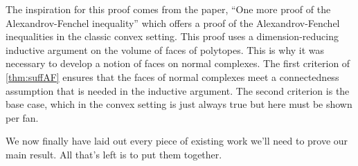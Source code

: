 \documentclass[12pt,oneside]{../../sfsuthesis}
\begin{document}
The inspiration for this proof comes from the paper, ``One more proof of the Alexandrov-Fenchel inequality'' \cite{cordero-erausquinOneMoreProof2019} which offers a proof of the Alexandrov-Fenchel inequalities in the classic convex setting.
This proof uses a dimension-reducing inductive argument on the volume of faces of polytopes.
This is why it was necessary to develop a notion of faces on normal complexes.
The first criterion of \th\ref{thm:suffAF} ensures that the faces of normal complexes meet a connectedness assumption that is needed in the inductive argument.
The second criterion is the base case, which in the convex setting is just always true but here must be shown per fan.

We now finally have laid out every piece of existing work we'll need to prove our main result.
All that's left is to put them together.
\end{document}
